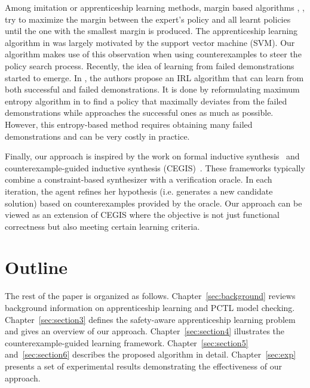 Among imitation or apprenticeship learning methods, margin based algorithms \cite{Abbeel:2004:ALV:1015330.1015430}, \cite{Ng:2000:AIR:645529.657801}, \cite{Ratliff:2006:MMP:1143844.1143936} try to maximize the margin between the expert's policy and all learnt policies until the one with the smallest margin is produced. The apprenticeship learning algorithm in \cite{Abbeel:2004:ALV:1015330.1015430} was largely motivated by the support vector machine (SVM). Our algorithm makes use of this observation when using counterexamples to steer the policy search process.
Recently, the idea of learning from failed demonstrations started to emerge. 
In \cite{shiarlis2016inverse}, the authors propose an IRL algorithm that can learn from both successful and failed demonstrations. It is done by reformulating maximum entropy algorithm in \cite{Ziebart:2008:MEI:1620270.1620297} to find a policy that maximally deviates from the failed demonstrations while approaches the successful ones as much as possible. However, this entropy-based method requires obtaining many failed demonstrations and can be very costly in practice. 

Finally, our approach is inspired by the work on formal inductive synthesis~\cite{jha-ai2017} and counterexample-guided inductive synthesis (CEGIS)~\cite{CEGIS}. These frameworks typically combine a constraint-based synthesizer with a verification oracle. In each iteration, the agent refines her hypothesis (i.e. generates a new candidate solution) based on counterexamples provided by the oracle. Our approach can be viewed as an extension of CEGIS where the objective is not just functional correctness but also meeting certain learning criteria. 

\section{Outline}
The rest of the paper is organized as follows. 
Chapter~\ref{sec:background} reviews background information on apprenticeship learning and PCTL model checking. 
Chapter~\ref{sec:section3} defines the safety-aware apprenticeship learning problem and gives an overview of our approach. 
Chapter~\ref{sec:section4} illustrates the counterexample-guided learning framework. 
Chapter~\ref{sec:section5} and~\ref{sec:section6} describes the proposed algorithm in detail. 
Chapter~\ref{sec:exp} presents a set of experimental results demonstrating the effectiveness of our approach. 

